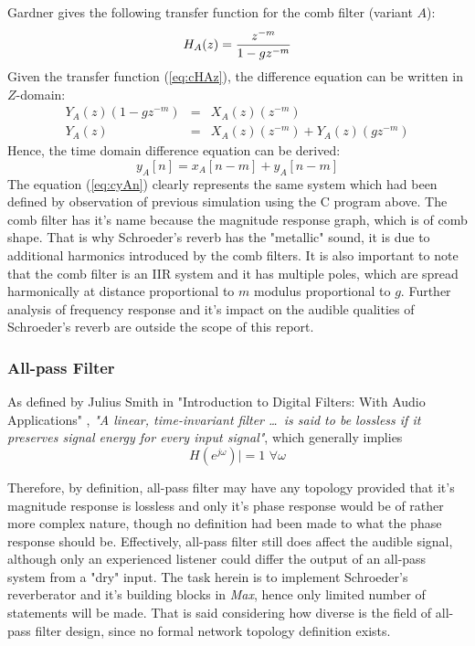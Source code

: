 \documentclass[12pt]{report}
\begin{document}
  

  Gardner \cite{gardner1998algorithms} gives the following transfer function
  for the comb filter (variant $A$):\begin{equation}\label{eq:cHAz}
    H_A(z)={{z^{-m}}\over{1-gz^{-m}}}
  \end{equation}
  Given the transfer function (\ref{eq:cHAz}), the difference equation can be
  written in $Z$-domain:\begin{eqnarray}
    Y_A(z)(1-gz^{-m}) &=& X_A(z)(z^{-m})\\
    Y_A(z) &=& X_A(z)(z^{-m}) + Y_A(z)(gz^{-m})
  \end{eqnarray}
  Hence, the time domain difference equation can be derived:
  \begin{equation}\label{eq:cyAn}
    y_A[n] = x_A[n-m] + y_A[n-m]
  \end{equation}
  The equation (\ref{eq:cyAn}) clearly represents the same system which had been
  defined by observation of previous simulation using the C program above.
  The comb filter has it's name because the magnitude response graph, which is
  of comb shape. That is why Schroeder's reverb has the "metallic" sound, it
  is due to additional harmonics introduced by the comb filters. It is also
  important to note that the comb filter is an IIR system and it has multiple
  poles, which are spread harmonically at distance proportional to $m$ modulus
  proportional to $g$. Further analysis of frequency response and it's impact
  on the audible qualities of Schroeder's reverb are outside the scope of this
  report.

  \subsubsection{All-pass Filter}
  As defined by Julius Smith in "Introduction to Digital Filters: With Audio
  Applications" \cite{smith2007introduction}, \emph{"A linear, time-invariant
  filter \dots\ is said to be lossless if it preserves signal energy for every
  input signal"}, which generally implies \begin{equation} \label{eq:allpass}
    H(e^{j\omega})|=1\,\,\forall\omega \end{equation}

  Therefore, by definition, all-pass filter may have any topology provided
  that it's magnitude response is lossless and only it's phase response would
  be of rather more complex nature, though no definition had been made to
  what the phase response should be. Effectively, all-pass filter still
  does affect the audible signal, although only an experienced listener
  could differ the output of an all-pass system from a "dry" input. The
  task herein is to implement Schroeder's reverberator and it's building
  blocks in \emph{Max}, hence only limited number of statements will be made.
  That is said considering how diverse is the field of all-pass filter design,
  since no formal network topology definition exists.
\end{document}
